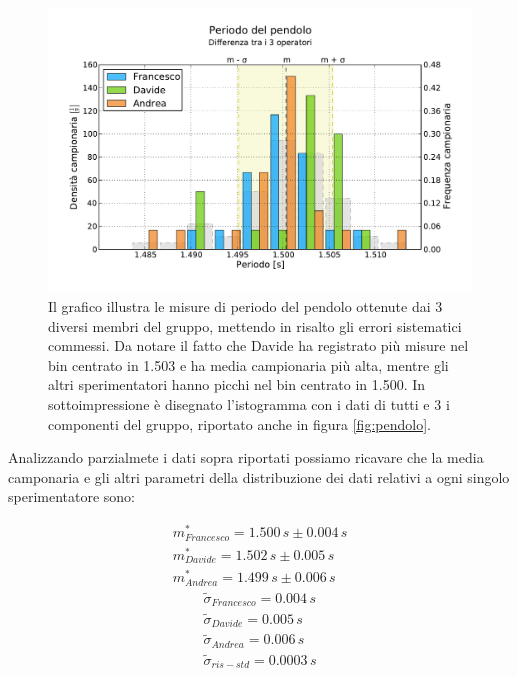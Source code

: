 \begin{figure}[bt]
	\centering
	\includegraphics[width=150mm]{grafici/pendolo3.pdf}
	\caption{Il grafico illustra le misure di periodo del pendolo ottenute
        dai 3 diversi membri del gruppo, mettendo in risalto gli errori
        sistematici commessi. Da notare il fatto che Davide ha registrato più
        misure nel bin centrato in 1.503 e ha media campionaria più alta, mentre gli
        altri sperimentatori hanno picchi nel bin centrato in 1.500. In sottoimpressione
        è disegnato l'istogramma con i dati di tutti e 3 i componenti del gruppo, riportato
        anche in figura \ref{fig:pendolo}.}
    \label{fig:pendolo3}
\end{figure}

Analizzando parzialmete i dati sopra riportati possiamo ricavare che la media
camponaria e gli altri parametri della distribuzione dei dati relativi a
ogni singolo sperimentatore sono:

\begin{equation*}
	\begin{split}
		m_{Francesco}^* = 1.500\,s \pm 0.004\,s \\
		m_{Davide}^* = 1.502\,s \pm 0.005\,s \\
		m_{Andrea}^* = 1.499\,s \pm 0.006\,s
	\end{split}
\end{equation*}
\begin{equation*}
	\begin{split}
		\tilde{\sigma}_{Francesco} = 0.004\,s \\
		\tilde{\sigma}_{Davide} = 0.005\,s \\
		\tilde{\sigma}_{Andrea} = 0.006\,s \\
		\tilde{\sigma}_{ris-std} = 0.0003\,s
	\end{split}
\end{equation*}\\


